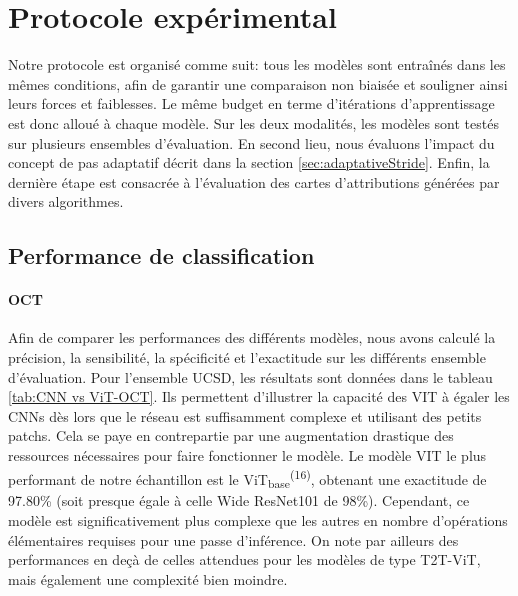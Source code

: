 \section{Protocole expérimental}
\label{sec:resultsFocusedAttention}
Notre protocole est organisé comme suit: tous les modèles sont entraînés dans les mêmes conditions, afin de garantir une comparaison non biaisée et souligner ainsi leurs forces et faiblesses. Le même budget en terme d'itérations d'apprentissage est donc alloué à chaque modèle. Sur les deux modalités, les modèles sont testés sur plusieurs ensembles d'évaluation. En second lieu, nous évaluons l'impact du concept de pas adaptatif décrit dans la section \ref{sec:adaptativeStride}. Enfin, la dernière étape est consacrée à l'évaluation des cartes d'attributions générées par divers algorithmes. 
\subsection{Performance de classification}
\paragraph{OCT} Afin de comparer les performances des différents modèles, nous avons calculé la précision, la sensibilité, la spécificité et l'exactitude sur les différents ensemble d'évaluation. Pour l'ensemble UCSD, les résultats sont données dans le tableau \ref{tab:CNN vs ViT-OCT}. Ils permettent d'illustrer la capacité des \ac{VIT} à égaler les \ac{CNN}s dès lors que le réseau est suffisamment complexe et utilisant des petits patchs. Cela se paye en contrepartie par une augmentation drastique des ressources nécessaires pour faire fonctionner le modèle. Le modèle \ac{VIT} le plus performant de notre échantillon est le ViT\textsubscript{base}\textsuperscript{(16)}, obtenant une exactitude de 97.80\% (soit presque égale à celle Wide ResNet101 de 98\%). Cependant, ce modèle est significativement plus complexe que les autres en nombre d'opérations élémentaires requises pour une passe d'inférence. On note par ailleurs des performances en deçà de celles attendues pour les modèles de type T2T-ViT, mais également une complexité bien moindre. 

